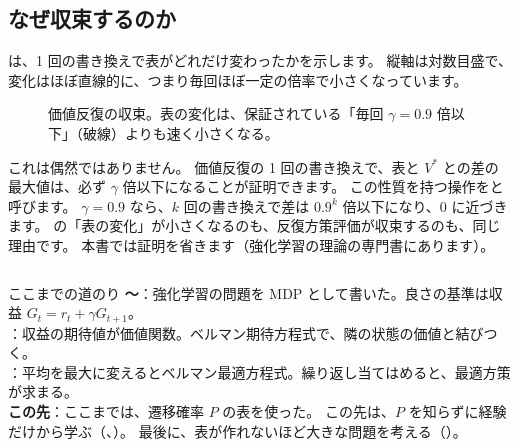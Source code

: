\subsection*{なぜ収束するのか}

は、1 回の書き換えで表がどれだけ変わったかを示します。
縦軸は対数目盛で、変化はほぼ直線的に、つまり毎回ほぼ一定の倍率で小さくなっています。

\begin{figure}[tbp]
\centering
{}
\caption{価値反復の収束。表の変化は、保証されている「毎回 $\gamma=0.9$ 倍以下」（破線）よりも速く小さくなる。}
\label{fig:rlb-vi-conv}
\end{figure}

これは偶然ではありません。
価値反復の 1 回の書き換えで、表と $V^\ast$ との差の最大値は、必ず $\gamma$ 倍以下になることが証明できます。
この性質を持つ操作をと呼びます。
$\gamma=0.9$ なら、$k$ 回の書き換えで差は $0.9^k$ 倍以下になり、0 に近づきます。
の「表の変化」が小さくなるのも、反復方策評価が収束するのも、同じ理由です。
本書では証明を省きます（強化学習の理論の専門書にあります）。

\begin{column}{ここまでの道のり}
\textbf{〜}：強化学習の問題を MDP として書いた。良さの基準は収益 $G_t=r_t+\gamma G_{t+1}$。\\
\textbf{}：収益の期待値が価値関数。ベルマン期待方程式で、隣の状態の価値と結びつく。\\
\textbf{}：平均を最大に変えるとベルマン最適方程式。繰り返し当てはめると、最適方策が求まる。\\
\textbf{この先}：ここまでは、遷移確率 $P$ の表を使った。
この先は、$P$ を知らずに経験だけから学ぶ（、）。
最後に、表が作れないほど大きな問題を考える（）。
\end{column}

